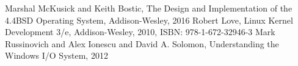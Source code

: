 \documentclass[letterpaper,10pt,draftclsnofoot,onecolumn,titlepage]{IEEEtran}
\begin{document}
	\clearpage

	\begin{thebibliography}{3}
			Marshal McKusick and Keith Bostic,
			The Design and Implementation of the 4.4BSD Operating System,
			Addison-Wesley,
			2016
			Robert Love,
			Linux Kernel Development 3/e,
			Addison-Wesley,
			2010,
			ISBN: 978-1-672-32946-3
			Mark Russinovich and Alex Ionescu and David A. Solomon,
			Understanding the Windows I/O System,
			2012
	\end{thebibliography}
\end{document}

